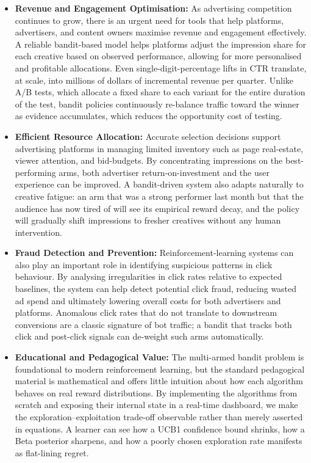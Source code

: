\begin{itemize}
\item \textbf{Revenue and Engagement Optimisation:} As advertising competition continues to grow, there is an urgent need for tools that help platforms, advertisers, and content owners maximise revenue and engagement effectively. A reliable bandit-based model helps platforms adjust the impression share for each creative based on observed performance, allowing for more personalised and profitable allocations. Even single-digit-percentage lifts in CTR translate, at scale, into millions of dollars of incremental revenue per quarter. Unlike A/B tests, which allocate a fixed share to each variant for the entire duration of the test, bandit policies continuously re-balance traffic toward the winner as evidence accumulates, which reduces the opportunity cost of testing.

\item \textbf{Efficient Resource Allocation:} Accurate selection decisions support advertising platforms in managing limited inventory such as page real-estate, viewer attention, and bid-budgets. By concentrating impressions on the best-performing arms, both advertiser return-on-investment and the user experience can be improved. A bandit-driven system also adapts naturally to creative fatigue: an arm that was a strong performer last month but that the audience has now tired of will see its empirical reward decay, and the policy will gradually shift impressions to fresher creatives without any human intervention.

\item \textbf{Fraud Detection and Prevention:} Reinforcement-learning systems can also play an important role in identifying suspicious patterns in click behaviour. By analysing irregularities in click rates relative to expected baselines, the system can help detect potential click fraud, reducing wasted ad spend and ultimately lowering overall costs for both advertisers and platforms. Anomalous click rates that do not translate to downstream conversions are a classic signature of bot traffic; a bandit that tracks both click and post-click signals can de-weight such arms automatically.

\item \textbf{Educational and Pedagogical Value:} The multi-armed bandit problem is foundational to modern reinforcement learning, but the standard pedagogical material is mathematical and offers little intuition about how each algorithm behaves on real reward distributions. By implementing the algorithms from scratch and exposing their internal state in a real-time dashboard, we make the exploration--exploitation trade-off observable rather than merely asserted in equations. A learner can see how a UCB1 confidence bound shrinks, how a Beta posterior sharpens, and how a poorly chosen exploration rate manifests as flat-lining regret.


\end{itemize}
